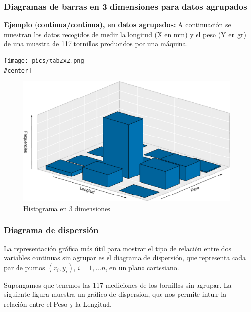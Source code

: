 \documentclass[]{article}
\numberwithin{equation}{section}
\begin{document}
\subsubsection{Diagramas de barras en 3 dimensiones para datos
agrupados}\label{diagramas-de-barras-en-3-dimensiones-para-datos-agrupados}

\textbf{Ejemplo (continua/continua), en datos agrupados:} A continuación
se muestran los datos recogidos de medir la longitud (X en mm) y el peso
(Y en gr) de una muestra de 117 tornillos producidos por una máquina.

\texttt{[image: pics/tab2x2.png\\\#center]}

\begin{figure}

{\centering \includegraphics{tema3_files/figure-latex/unnamed-chunk-1-1} 

}

\caption{Histograma en 3 dimensiones}\label{fig:unnamed-chunk-1}
\end{figure}

\subsubsection{Diagrama de dispersión}\label{diagrama-de-dispersion}

La representación gráfica más útil para mostrar el tipo de relación
entre dos variables continuas sin agrupar es el diagrama de dispersión,
que representa cada par de puntos \((x_i,y_i)\), \(i=1,...n\), en un
plano cartesiano.

Supongamos que tenemos las 117 mediciones de los tornillos sin agrupar.
La siguiente figura muestra un gráfico de dispersión, que nos permite
intuir la relación entre el Peso y la Longitud.
\end{document}
